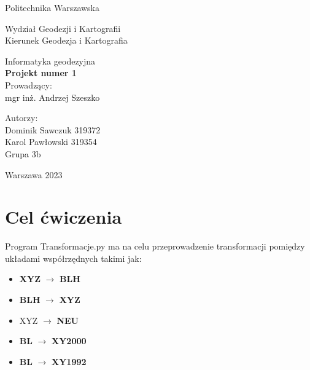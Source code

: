 \documentclass[a4paper,titleauthor]{mwart}
\begin{document}
\thispagestyle{empty}
\begin{center}{\sc \Large
Politechnika Warszawska\\
}\par\vspace{0.2cm}\par
{\large
Wydział Geodezji i Kartografii\\
Kierunek Geodezja i Kartografia

}\end{center}
\vspace{5cm}
\begin{center}

{\LARGE
 Informatyka geodezyjna\\
\textbf{Projekt numer 1}\\

Prowadzący:\\
mgr inż. Andrzej Szeszko\\

}
\end{center}
\vspace{4cm}
\begin{flushright}

{\large
Autorzy:\\
Dominik Sawczuk 319372\\
Karol Pawłowski 319354 \\
Grupa 3b\\
}
\end{flushright}
\vfill
\begin{center}
Warszawa 2023
\end{center}

\newpage

\tableofcontents
\newpage
\section{Cel ćwiczenia} 
Program Transformacje.py ma na celu przeprowadzenie transformacji pomiędzy układami współrzędnych takimi jak:
\begin{itemize}
    \item \textbf{XYZ} $\rightarrow$ \textbf{BLH}
    \item \textbf{BLH} $\rightarrow$ \textbf{XYZ}
    \item XYZ $\rightarrow$ \textbf{NEU}
    \item \textbf{BL} $\rightarrow$ \textbf{XY2000}
    \item \textbf{BL} $\rightarrow$ \textbf{XY1992}
\end{itemize}
\end{document}
